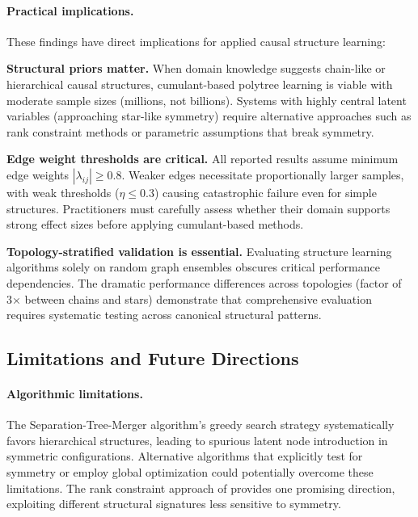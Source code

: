 \documentclass[11pt,a4paper]{article}
\numberwithin{equation}{section}
\begin{document}
\paragraph{Practical implications.} These findings have direct implications for applied causal structure learning:

\textbf{Structural priors matter.} When domain knowledge suggests chain-like or hierarchical causal structures, cumulant-based polytree learning is viable with moderate sample sizes (millions, not billions). Systems with highly central latent variables (approaching star-like symmetry) require alternative approaches such as rank constraint methods \citep{cai:etal:2024:rank} or parametric assumptions that break symmetry.

\textbf{Edge weight thresholds are critical.} All reported results assume minimum edge weights $|\lambda_{ij}| \geq 0.8$. Weaker edges necessitate proportionally larger samples, with weak thresholds ($\eta \leq 0.3$) causing catastrophic failure even for simple structures. Practitioners must carefully assess whether their domain supports strong effect sizes before applying cumulant-based methods.

\textbf{Topology-stratified validation is essential.} Evaluating structure learning algorithms solely on random graph ensembles obscures critical performance dependencies. The dramatic performance differences across topologies (factor of 3× between chains and stars) demonstrate that comprehensive evaluation requires systematic testing across canonical structural patterns.

\subsection{Limitations and Future Directions}

\paragraph{Algorithmic limitations.} The Separation-Tree-Merger algorithm's greedy search strategy systematically favors hierarchical structures, leading to spurious latent node introduction in symmetric configurations. Alternative algorithms that explicitly test for symmetry or employ global optimization could potentially overcome these limitations. The rank constraint approach of \citet{cai:etal:2024:rank} provides one promising direction, exploiting different structural signatures less sensitive to symmetry.
\end{document}
